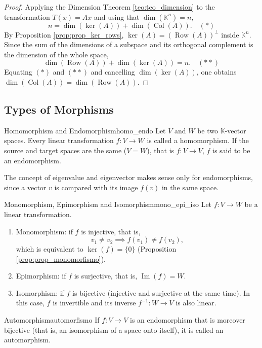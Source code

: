 \documentclass[11pt, a4paper]{article}
\begin{document}
\begin{proof}
Applying the Dimension Theorem \ref{teo:teo_dimension} to the transformation $T(x) = Ax$ and using that $\dim(\mathbb{K}^n) = n$,
\[ n = \dim(\ker(A)) + \dim(\operatorname{Col}(A)). \quad (*) \]
By Proposition \ref{prop:prop_ker_rows}, $\ker(A) = (\operatorname{Row}(A))^\perp$ inside $\mathbb{K}^n$. Since the sum of the dimensions of a subspace and its orthogonal complement is the dimension of the whole space,
\[ \dim(\operatorname{Row}(A)) + \dim(\ker(A)) = n. \quad (**) \]
Equating $(*)$ and $(**)$ and cancelling $\dim(\ker(A))$, one obtains $\dim(\operatorname{Col}(A)) = \dim(\operatorname{Row}(A))$.
\end{proof}

\subsection{Types of Morphisms}

\begin{definicion}{Homomorphism and Endomorphism}{homo_endo}
Let $V$ and $W$ be two $\mathbb{K}$-vector spaces. Every linear transformation $f: V \to W$ is called a homomorphism.
If the source and target spaces are the same ($V = W$), that is $f: V \to V$, $f$ is said to be an endomorphism.

\end{definicion}

\obs The concept of eigenvalue and eigenvector makes sense only for endomorphisms, since a vector $v$ is compared with its image $f(v)$ in the same space.

\begin{definicion}{Monomorphism, Epimorphism and Isomorphism}{mono_epi_iso}
Let $f: V \to W$ be a linear transformation.
\begin{enumerate}
    \item Monomorphism: if $f$ is injective, that is,
    \[ v_1 \neq v_2 \implies f(v_1) \neq f(v_2), \]
    which is equivalent to $\ker(f) = \{0\}$ (Proposition \ref{prop:prop_monomorfismo}).
    \item Epimorphism: if $f$ is surjective, that is, $\operatorname{Im}(f) = W$.
    \item Isomorphism: if $f$ is bijective (injective and surjective at the same time). In this case, $f$ is invertible and its inverse $f^{-1}: W \to V$ is also linear.
\end{enumerate}
\end{definicion}

\begin{definicion}{Automorphism}{automorfismo}
If $f: V \to V$ is an endomorphism that is moreover bijective (that is, an isomorphism of a space onto itself), it is called an automorphism.
\end{definicion}
\end{document}
